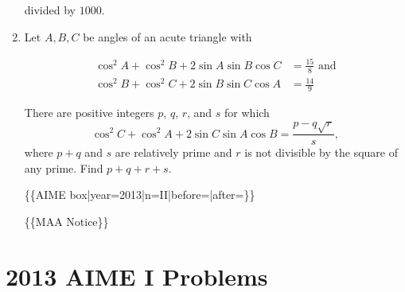 \documentclass{article}
\begin{document}
\begin{enumerate}[label=\arabic*., itemsep=0.5em]
divided by \(1000\).\par \vspace{0.5em}\item Let \(A,B,C\) be angles of an acute triangle with

\begin{align*}
\cos^2 A + \cos^2 B + 2 \sin A \sin B \cos C &= \frac{15}{8} \text{ and} \\
\cos^2 B + \cos^2 C + 2 \sin B \sin C \cos A &= \frac{14}{9}
\end{align*}

There are positive integers \(p\), \(q\), \(r\), and \(s\) for which 
\begin{equation*}
\cos^2 C + \cos^2 A + 2 \sin C \sin A \cos B = \frac{p-q\sqrt{r}}{s},
\end{equation*}
 where \(p+q\) and \(s\) are relatively prime and \(r\) is not divisible by the square of any prime.  Find \(p+q+r+s\).



\{\{AIME box|year=2013|n=II|before=|after=\}\}

\{\{MAA Notice\}\}\par \vspace{0.5em}
\end{enumerate}
\newpage\section*{2013 AIME I Problems}
\end{document}
